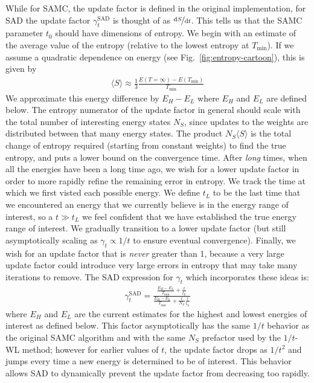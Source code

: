 \documentclass[letterpaper,twocolumn,amsmath,amssymb,pre,aps,10pt]{revtex4-1}
\begin{document}
While for SAMC, the update factor is defined in the original
implementation, for SAD the update factor $\gamma_{t}^{\text{SAD}}$ is
thought of as $\nicefrac{\text{d}S}{\text{d}t}$. This tells us that
the SAMC parameter
$t_0$ should have dimensions of entropy.
We begin with an estimate of the average value of the entropy (relative
to the lowest entropy at $T_{\min}$).  If we assume a quadratic
dependence on energy (see Fig.~\ref{fig:entropy-cartoon}), this is given by
\begin{align}
\langle S\rangle \approx \frac13 \frac{E({T=\infty}) - E(T_{\min})}{T_{\min}}
\end{align}
We approximate this energy difference by $E_H -E_L$ where $E_H$ and
$E_L$ are defined below. The entropy numerator of the update factor in
general should scale with the total number of interesting energy states
$N_S$, since updates to the weights are distributed between that many
energy states.  The product $N_S\langle S\rangle$ is the total change
of entropy required (starting from constant weights) to find the true
entropy, and puts a lower bound on the convergence time. After
\emph{long} times, when all the energies have been a long time ago, we
wish for a lower update factor in order to more rapidly refine the
remaining error in entropy.  We track the time at which we first visted
each possible energy.  We define $t_L$ to be the last time that we
encountered an energy that we currently believe is in the energy range
of interest, so a $t\gg t_L$ we feel confident that we have established
the true energy range of interest. We gradually transition to a lower
update factor (but still asymptotically scaling as $\gamma_t \propto
1/t$ to ensure eventual convergence).  Finally, we wish for an update
factor that is \emph{never} greater than 1, because a very large update
factor could introduce very large errors in entropy that may take many iterations
to remove.  The SAD expression for $\gamma_t$ which incorporates these
ideas is:
\begin{align}
  \gamma_{t}^{\text{SAD}} =
     \frac{
       \frac{E_{H}-E_{L}}{T_{\text{min}}} + \frac{t}{t_L}
     }{
       \frac{E_{H}-E_{L}}{T_{\text{min}}} + \frac{t}{N_S}\frac{t}{t_L}
     }
\end{align}
where $E_H$ and $E_L$ are the current estimates for the highest and
lowest energies of interest as defined below.  This factor
asymptotically has the same $1/t$ behavior as the original SAMC
algorithm and with the same $N_S$ prefactor used by the $1/t$-WL
method; however for earlier values of $t$, the update factor drops as
$1/t^2$ and jumps every time a new energy is determined to be of
interest.  This behavior allows SAD to dynamically prevent the update
factor from decreasing too rapidly.
\end{document}
